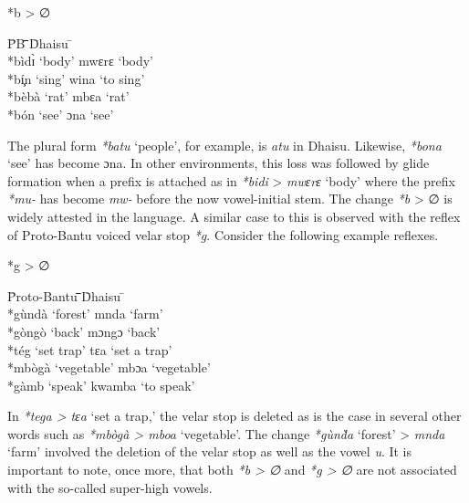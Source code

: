 \documentclass[output=paper,colorlinks,citecolor=brown]{langscibook}
\begin{document}
\ea%
    \label{ex:ngonyani:6}
    *b > ∅\\
    \begin{tabbing} 
        \= PB \quad\= \quad\= \quad\= \quad\= \quad\= \quad\= \quad\= Dhaisu \quad\=  \quad\= \\
        \> *bìdɪ̀
        \> ‘body’
        \> \> \>  \> \> \> mwɛrɛ
        \> ‘body’\\
        \> *bí̧n
        \> ‘sing’
        \> \> \>  \> \> \> wina
        \> ‘to sing’\\
        \> *bèbà
        \> ‘rat’
        \> \> \>  \> \> \> mbɛa
        \> ‘rat’\\
        \> *bón
        \> ‘see’
        \> \> \>  \> \> \>  ɔna
        \> ‘see’
    \end{tabbing}
\z
The plural form \textit{*batu}  `people', for example, is \textit{atu} in Dhaisu. Likewise, \textit{*bona} `see' has become ɔna. In other environments, this loss was followed by glide formation when a prefix is attached as in \textit{*bidi} > \textit{mwɛrɛ} `body' where the prefix  \textit{*mu-} has become \textit{mw-} before the now vowel-initial stem. The change \textit{*b} > ∅ is widely attested in the language. A similar case to this is observed with the reflex of Proto-Bantu voiced velar stop \textit{*g}. Consider the following example reflexes. 

\ea%
    \label{ex:ngonyani:7}
    *g > ∅\\
	\begin{tabbing} 
        \= Proto-Bantu \quad\= \quad\= \quad\= \quad\= \quad\= \quad\= \quad\= Dhaisu \quad\=  \quad\= \\
        \> *gùndà
        \> ‘forest’\> \> \>  \> \> \> 
        mnda
        \> ‘farm’\\
        \> *gòngò
        \> ‘back’ \> \> \>  \> \> \> 
        mɔngɔ
        \> ‘back’\\
        \> *tég
        \> ‘set trap’\> \> \>  \> \> \> 
        tɛa
        \> ‘set a trap’\\
        \> *mbògà
        \> ‘vegetable’\> \> \>  \> \> \> 
        mbɔa
        \> ‘vegetable’\\
        \> *gàmb
        \> `speak’\> \> \>  \> \> \> 
        kwamba
        \> ‘to speak’
   \end{tabbing}
\z

In \textit{*tega > tɛa} `set a trap,’ the velar stop is deleted as is the case in several other words such as \textit{*mbògà > mboa} `vegetable’. The change \textit{*gùnd̀a} ‘forest’ > \textit{mnda} `farm’ involved the deletion of the velar stop as well as the vowel \textit{u}. It is important to note, once more, that both \textit{*b > ∅} and \textit{*g > ∅} are not associated with the so-called super-high vowels. 
\end{document}
